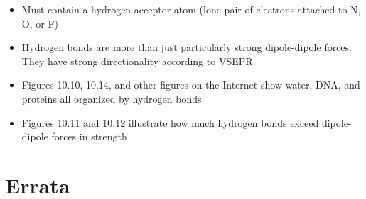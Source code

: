 \documentclass[12pt, openany, letterpaper]{memoir}
\begin{document}
\begin{itemize}
\begin{itemize}
\begin{itemize}
      \item Must contain a hydrogen-acceptor atom (lone pair of electrons attached to N, O, or F)
      \item Hydrogen bonds are more than just particularly strong dipole-dipole forces. They have strong directionality according to VSEPR
      \item Figures 10.10, 10.14, and other figures on the Internet show water, DNA, and proteins all organized by hydrogen bonds
      \item Figures 10.11 and 10.12 illustrate how much hydrogen bonds exceed dipole-dipole forces in strength
    \end{itemize}
  \end{itemize}
\end{itemize}
\backmatter
\chapter{Errata}
\end{document}

